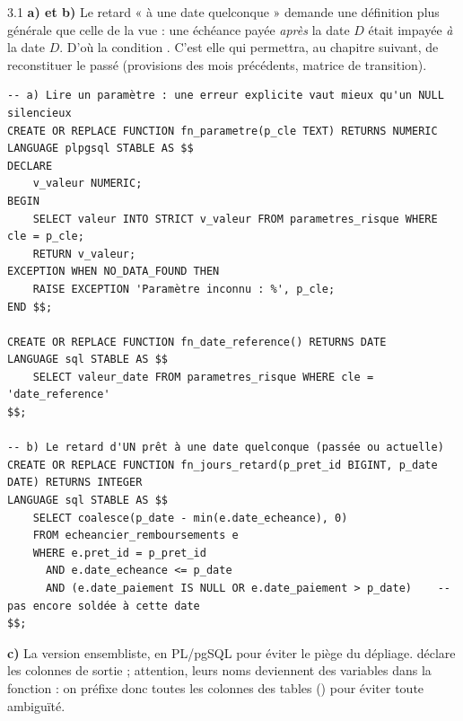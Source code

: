 \begin{correction}{3.1}
\textbf{a) et b)} Le retard « à une date quelconque » demande une définition plus générale que celle de
la vue : une échéance payée \emph{après} la date $D$ était impayée \emph{à} la date $D$. D'où la
condition . C'est elle qui permettra, au chapitre
suivant, de reconstituer le passé (provisions des mois précédents, matrice de transition).

\begin{lstlisting}[style=long]
-- a) Lire un paramètre : une erreur explicite vaut mieux qu'un NULL silencieux
CREATE OR REPLACE FUNCTION fn_parametre(p_cle TEXT) RETURNS NUMERIC
LANGUAGE plpgsql STABLE AS $$
DECLARE
    v_valeur NUMERIC;
BEGIN
    SELECT valeur INTO STRICT v_valeur FROM parametres_risque WHERE cle = p_cle;
    RETURN v_valeur;
EXCEPTION WHEN NO_DATA_FOUND THEN
    RAISE EXCEPTION 'Paramètre inconnu : %', p_cle;
END $$;

CREATE OR REPLACE FUNCTION fn_date_reference() RETURNS DATE
LANGUAGE sql STABLE AS $$
    SELECT valeur_date FROM parametres_risque WHERE cle = 'date_reference'
$$;

-- b) Le retard d'UN prêt à une date quelconque (passée ou actuelle)
CREATE OR REPLACE FUNCTION fn_jours_retard(p_pret_id BIGINT, p_date DATE) RETURNS INTEGER
LANGUAGE sql STABLE AS $$
    SELECT coalesce(p_date - min(e.date_echeance), 0)
    FROM echeancier_remboursements e
    WHERE e.pret_id = p_pret_id
      AND e.date_echeance <= p_date
      AND (e.date_paiement IS NULL OR e.date_paiement > p_date)    -- pas encore soldée à cette date
$$;
\end{lstlisting}

\textbf{c)} La version ensembliste, en PL/pgSQL pour éviter le piège du dépliage. 
déclare les colonnes de sortie ; attention, leurs noms deviennent des variables dans la fonction : on
préfixe donc toutes les colonnes des tables () pour éviter toute ambiguïté.


\end{correction}
